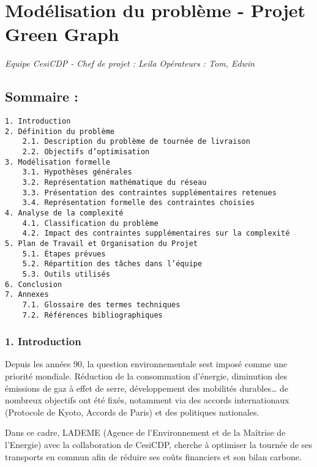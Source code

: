 \protect{}\label{69fe235d}
\section{Modélisation du problème - Projet Green
Graph}\label{moduxe9lisation-du-probluxe8me---projet-green-graph}

\emph{Equipe CesiCDP - Chef de projet : Leila \textbar{} Opérateurs :
Tom, Edwin}

\subsection{Sommaire :}\label{sommaire-}

\begin{verbatim}
1. Introduction
2. Définition du problème 
    2.1. Description du problème de tournée de livraison
    2.2. Objectifs d’optimisation
3. Modélisation formelle
    3.1. Hypothèses générales
    3.2. Représentation mathématique du réseau
    3.3. Présentation des contraintes supplémentaires retenues
    3.4. Représentation formelle des contraintes choisies
4. Analyse de la complexité
    4.1. Classification du problème
    4.2. Impact des contraintes supplémentaires sur la complexité
5. Plan de Travail et Organisation du Projet
    5.1. Étapes prévues 
    5.2. Répartition des tâches dans l’équipe
    5.3. Outils utilisés 
6. Conclusion
7. Annexes
    7.1. Glossaire des termes techniques
    7.2. Références bibliographiques
\end{verbatim}

\protect{}\label{c757c557}
\subsubsection{1. Introduction}\label{1-introduction}

Depuis les années 90, la question environnementale s\textquotesingle est
imposé comme une priorité mondiale. Réduction de la consommation
d'énergie, diminution des émissions de gaz à effet de serre,
développement des mobilités durables\ldots{} de nombreux objectifs ont
été fixés, notamment via des accords internationaux (Protocole de Kyoto,
Accords de Paris) et des politiques nationales.

Dans ce cadre, L\textquotesingle ADEME (Agence de l'Environnement et de
la Maîtrise de l'Energie) avec la collaboration de CesiCDP, cherche à
optimiser la tournée de ses transports en commun afin de réduire ses
coûts financiers et son bilan carbone.


